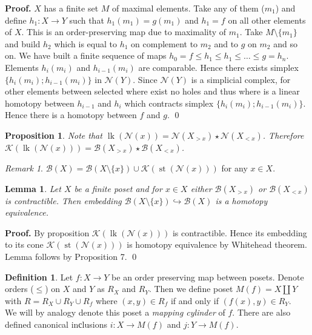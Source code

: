\documentclass[a4paper, 12pt]{article}
\newtheorem{proposition}{Proposition}
\newtheorem{lemma}{Lemma}
\theoremstyle{definition}
\newtheorem{definition}{Definition}
\theoremstyle{remark}
\newtheorem{remark}{Remark}
\newenvironment{pf}{\noindent\textbf{Proof.}}{\qed}
\newcommand{\define}[1]{{\textit{#1}}}
\renewcommand{\leq}{\leqslant}
\begin{document}
\begin{pf}
  $X$ has a finite set $M$ of maximal elements. Take any of them ($m_1$) and define $h_1 : X \to Y$ such that $h_1(m_1) = g(m_1)$ and $h_1 = f$ on all other elements of $X$. This is an order-preserving map due to maximality of $m_1$. Take $M \setminus \{m_1\}$ and build $h_2$ which is equal to $h_1$ on complement to $m_2$ and to $g$ on $m_2$ and so on. We have built a finite sequence of maps $h_0 = f \leq h_1 \leq h_1 \leq \ldots \leq g = h_n$.\\

  Elements $h_i(m_i)$ and $h_{i-1}(m_i)$ are comparable. Hence there exists simplex $\{h_i(m_i); h_{i-1}(m_i)\}$ in $\mathcal{N}(Y)$. Since $\mathcal{N}(Y)$ is a simplicial complex, for other elements between selected where exist no holes and thus where is a linear homotopy between $h_{i-1}$ and $h_{i}$ which contracts simplex $\{h_i(m_i); h_{i-1}(m_i)\}$.\\

  Hence there is a homotopy between $f$ and $g$.
\end{pf}

\begin{proposition}
  Note that $\operatorname{lk}(\mathcal{N}(x)) = \mathcal{N}(X_{>x}) \star \mathcal{N}(X_{<x})$. Therefore $\mathcal{K}(\operatorname{lk}(\mathcal{N}(x))) = \mathcal{B}(X_{>x}) \star \mathcal{B}(X_{<x})$.
\end{proposition}

\begin{remark}
  $\mathcal{B}(X) = \mathcal{B}(X \setminus \{x\}) \cup \mathcal{K}(\operatorname{st}(\mathcal{N}(x)))$ for any $x \in X$.\\
\end{remark}

\begin{lemma}
  Let $X$ be a finite poset and for $x \in X$ either $\mathcal{B}(X_{>x})$ or $\mathcal{B}(X_{<x})$ is contractible. Then embedding $\mathcal{B}(X \setminus \{x\}) \hookrightarrow \mathcal{B}(X)$ is a homotopy equivalence.
\end{lemma}

\begin{pf}
  By proposition $\mathcal{K}(\operatorname{lk}(\mathcal{N}(x)))$ is contractible. Hence its embedding to its cone $\mathcal{K}(\operatorname{st}(\mathcal{N}(x)))$ is homotopy equivalence by Whitehead theorem. Lemma follows by Proposition 7.
\end{pf}

\begin{definition}
  Let $f : X \to Y$ be an order preserving map between posets. Denote orders ($\leq$) on $X$ and $Y$ as $R_X$ and $R_Y$. Then we define poset $M(f) = X \coprod Y$ with $R = R_X \cup R_Y \cup R_{f}$ where $(x,y) \in R_f$ if and only if $(f(x),y) \in R_Y$.\\

  We will by analogy denote this poset a \define{mapping cylinder} of $f$. There are also defined canonical inсlusions $i : X \to M(f)$ and $j : Y \to M(f)$.
\end{definition}
\end{document}
